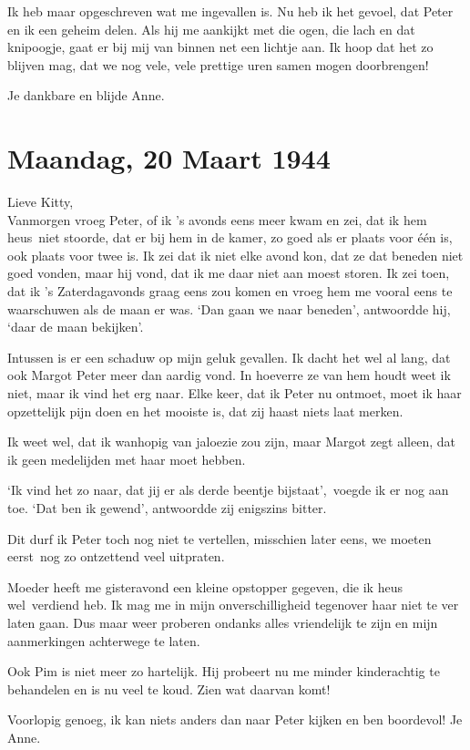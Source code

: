 \documentclass{book}
\begin{document}
Ik heb maar opgeschreven wat me ingevallen is. Nu heb ik het gevoel, dat Peter
en ik een geheim delen. Als hij me aankijkt met die ogen, die lach en dat
knipoogje, gaat er bij mij van binnen net een lichtje aan. Ik hoop dat het zo
blijven mag, dat we nog vele, vele prettige uren samen mogen doorbrengen!

Je dankbare en blijde Anne.

\section*{Maandag, 20 Maart 1944}

Lieve Kitty,\\
Vanmorgen vroeg Peter, of ik 's avonds eens meer kwam en zei, dat
ik hem heus~niet stoorde, dat er bij hem in de kamer, zo goed als er plaats voor
één is, ook plaats voor twee is. Ik zei dat ik niet elke avond kon, dat ze dat
beneden niet goed vonden, maar hij vond, dat ik me daar niet aan moest storen.
Ik zei toen, dat ik 's Zaterdagavonds graag eens zou komen en vroeg hem me
vooral eens te waarschuwen als de maan er was. `Dan gaan we naar beneden',
antwoordde hij, `daar de maan bekijken'.

Intussen is er een schaduw op mijn geluk gevallen. Ik dacht het wel al lang, dat
ook Margot Peter meer dan aardig vond. In hoeverre ze van hem houdt weet ik
niet, maar ik vind het erg naar. Elke keer, dat ik Peter nu ontmoet, moet ik
haar opzettelijk pijn doen en het mooiste is, dat zij haast niets laat merken.

Ik weet wel, dat ik wanhopig van jaloezie zou zijn, maar Margot zegt alleen, dat
ik geen medelijden met haar moet hebben.

`Ik vind het zo naar, dat jij er als derde beentje bijstaat',~voegde ik er nog
aan toe. `Dat ben ik gewend', antwoordde zij enigszins bitter.

Dit durf ik Peter toch nog niet te vertellen, misschien later eens, we moeten
eerst~nog zo ontzettend veel uitpraten.

Moeder heeft me gisteravond een kleine opstopper gegeven, die ik heus
wel~verdiend heb. Ik mag me in mijn onverschilligheid tegenover haar niet te ver
laten gaan. Dus maar weer proberen ondanks alles vriendelijk te zijn en mijn
aanmerkingen achterwege te laten.

Ook Pim is niet meer zo hartelijk. Hij probeert nu me minder kinderachtig te
behandelen en is nu veel te koud. Zien wat daarvan komt!

Voorlopig genoeg, ik kan niets anders dan naar Peter kijken en ben boordevol! Je
Anne.
\end{document}
